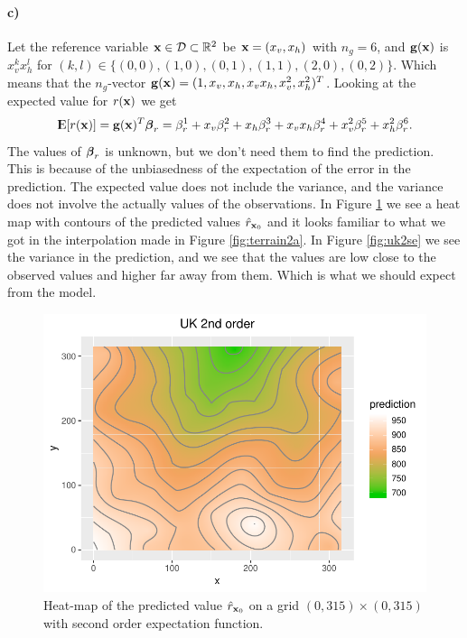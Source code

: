\paragraph{c)}
Let the reference variable $\boldsymbol{\mathbf{x}} \in \mathcal{D} \subset \mathbb{R}^2$ be $\boldsymbol{\mathbf{x}} = (x_v, x_h)$ with $n_g = 6$, and $\boldsymbol{\mathbf{g}}(\boldsymbol{\mathbf{x}})$ is $x_v^kx_h^l$ for $(k,l) \in \{(0,0),(1,0),(0,1),(1,1),(2,0),(0,2)\}$. Which means that the $n_g$-vector $\boldsymbol{\mathbf{g}}(\boldsymbol{\mathbf{x}}) = (1,x_v,x_h,x_vx_h,x_v^2,x_h^2)^T$. Looking at the expected value for $r(\boldsymbol{\mathbf{x}})$ we get
\begin{equation*}
    {\rm I\kern-.3em E}[r(\boldsymbol{\mathbf{x}})] = \boldsymbol{\mathbf{g}}(\boldsymbol{\mathbf{x}})^T \boldsymbol{\mathbf{\beta}}_r = \beta_r^1 + x_v \beta_r^2 + x_h \beta_r^3 + x_v x_h \beta_r^4 + x_v^2 \beta_r^5 + x_h^2 \beta_r^6.
\end{equation*}
The values of $\boldsymbol{\mathbf{\beta}}_r$ is unknown, but we don't need them to find the prediction. This is because of the unbiasedness of the expectation of the error in the prediction. 
The expected value does not include the variance, and the variance does not involve the actually values of the observations. 
In Figure \ref{fig:uk2} we see a heat map with contours of the predicted values $\hat{r}_{\boldsymbol{\mathbf{x}}_0}$ and it looks familiar to what we got in the interpolation made in Figure \ref{fig:terrain2a}. In Figure \ref{fig:uk2se} we see the variance in the prediction, and we see that the values are low close to the observed values and higher far away from them. Which is what we should expect from the model.
\begin{figure}[htb]
    \centering
    \includegraphics{figures/uk2.pdf}
    \caption{Heat-map of the predicted value $\hat{r}_{\boldsymbol{\mathbf{x}}_0}$ on a grid $(0,315)\times(0,315)$ with second order expectation function.}
    \label{fig:uk2}
\end{figure}

